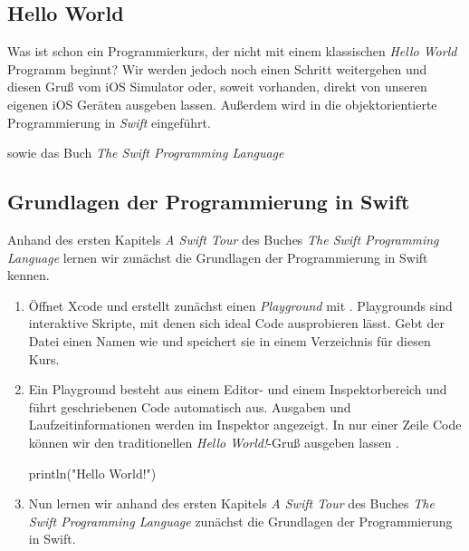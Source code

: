 \documentclass[parskip=half, final]{scrreprt}
\begin{document}
\begin{lecture} %


\chapter{Hello World}

Was ist schon ein Programmierkurs, der nicht mit einem klassischen \emph{Hello World} Programm beginnt? Wir werden jedoch noch einen Schritt weitergehen und diesen Gruß vom iOS Simulator oder, soweit vorhanden, direkt von unseren eigenen iOS Geräten ausgeben lassen. Außerdem wird in die objektorientierte Programmierung in \emph{Swift} eingeführt.

 sowie das Buch \emph{The Swift Programming Language} 


\section{Grundlagen der Programmierung in Swift}

Anhand des ersten Kapitels \emph{A Swift Tour} des Buches \emph{The Swift Programming Language} lernen wir zunächst die Grundlagen der Programmierung in Swift kennen.

\begin{enumerate}

\item Öffnet Xcode und erstellt zunächst einen \emph{Playground} mit . Playgrounds sind interaktive Skripte, mit denen sich ideal Code ausprobieren lässt. Gebt der Datei einen Namen wie  und speichert sie in einem Verzeichnis für diesen Kurs.
\item Ein Playground besteht aus einem Editor- und einem Inspektorbereich und führt geschriebenen Code automatisch aus. Ausgaben und Laufzeitinformationen werden im Inspektor angezeigt. In nur einer Zeile Code können wir den traditionellen \emph{Hello World!}-Gruß ausgeben lassen .

\begin{swiftcode}
println("Hello World!")	
\end{swiftcode}
	
\item Nun lernen wir anhand des ersten Kapitels \emph{A Swift Tour} des Buches \emph{The Swift Programming Language} zunächst die Grundlagen der Programmierung in Swift.
	

\end{enumerate}
\end{lecture}
\end{document}
